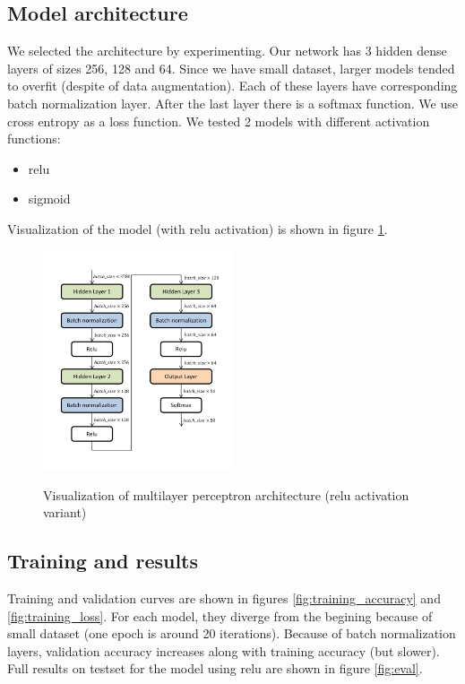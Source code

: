 \documentclass[a4paper]{article}
\begin{document}
\begin{multicols}{2}
\subsection{Model architecture}
We selected the architecture by experimenting.
Our network has 3 hidden dense layers of sizes 256, 128 and 64.
Since we have small dataset, larger models tended to overfit
(despite of data augmentation).
Each of these layers have corresponding batch normalization\cite{Batchnorm} layer.
After the last layer there is a softmax function.
We use cross entropy as a loss function.
We tested 2 models with different activation functions:
\begin{itemize}
    \item relu
    \item sigmoid
\end{itemize}

Visualization of the model (with relu activation) is shown in figure \ref{fig:arch}.

\begin{figure}[H]
    \caption[]{Visualization of multilayer perceptron architecture (relu activation variant)}
    \centering
    \includegraphics[page=1,width=0.5\textwidth]{architecture.pdf}
    \label{fig:arch}
\end{figure}


\subsection{Training and results}
Training and validation curves are shown in figures \ref{fig:training_accuracy} and \ref{fig:training_loss}.
For each model, they diverge from the begining because of small dataset (one epoch is around 20 iterations).
Because of batch normalization\cite{Batchnorm} layers, validation accuracy increases along with training accuracy (but slower).
Full results on testset for the model using relu are shown in figure \ref{fig:eval}.


\end{multicols}
\end{document}
